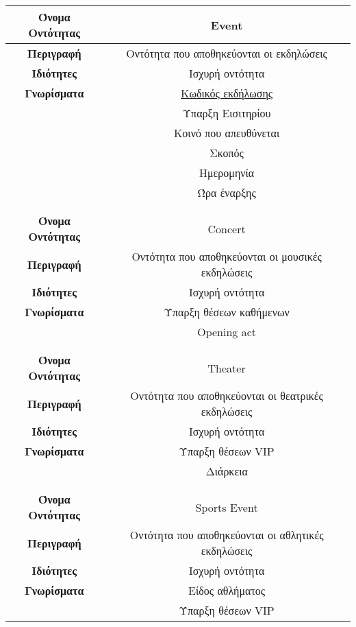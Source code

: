 \begin{center}
\begin{tabular}[]{|c | c|}
\hline
\textbf{Όνομα Οντότητας}   &  Event  \\ \hline 
\textbf{Περιγραφή}         &  Οντότητα που αποθηκεύονται οι εκδηλώσεις \\ \hline 
\textbf{Ιδιότητες}         &  Ισχυρή οντότητα \\  \hline               
\textbf{Γνωρίσματα}        &  \underline{Κωδικός εκδήλωσης} \\
            ~              &  Ύπαρξη Εισιτηρίου \\
             ~             &  Κοινό που απευθύνεται \\
              ~            &  Σκοπός \\ 
                           &  Ημερομηνία \\
                           &  Ώρα έναρξης\\
\\ \hline
\\ \hline
\textbf{Όνομα Οντότητας}   &  Concert  \\ \hline 
\textbf{Περιγραφή}         &  Οντότητα που αποθηκεύονται οι μουσικές εκδηλώσεις \\ \hline 
\textbf{Ιδιότητες}         &  Ισχυρή οντότητα \\  \hline               
\textbf{Γνωρίσματα}        &  Ύπαρξη θέσεων καθήμενων \\
                           &  Opening act \\
\\ \hline
\\ \hline
\textbf{Όνομα Οντότητας}   &  Theater  \\ \hline 
\textbf{Περιγραφή}         &  Οντότητα που αποθηκεύονται οι θεατρικές εκδηλώσεις \\ \hline 
\textbf{Ιδιότητες}         &  Ισχυρή οντότητα \\  \hline               
\textbf{Γνωρίσματα}        &  Ύπαρξη θέσεων VIP \\
                           &  Διάρκεια \\
\\ \hline
\\ \hline
\textbf{Όνομα Οντότητας}   &  Sports Event  \\ \hline 
\textbf{Περιγραφή}         &  Οντότητα που αποθηκεύονται οι αθλητικές εκδηλώσεις \\ \hline 
\textbf{Ιδιότητες}         &  Ισχυρή οντότητα \\  \hline               
\textbf{Γνωρίσματα}        &  Είδος αθλήματος \\
                           &  Ύπαρξη θέσεων VIP \\
                           

\end{tabular}
\end{center}
